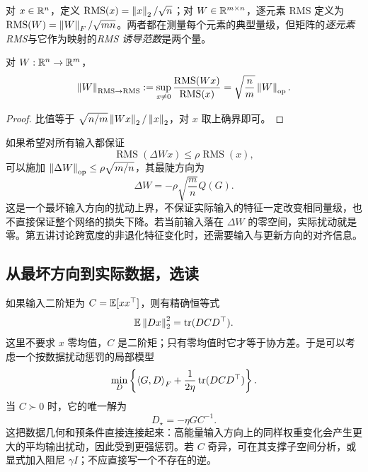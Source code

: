 对 $x\in\mathbb R^n$，定义
$\operatorname{RMS}(x)=\left\lVert x\right\rVert_2/\sqrt n$；对 $W\in\mathbb R^{m\times n}$，逐元素 RMS 定义为
$\operatorname{RMS}(W)=\left\lVert W\right\rVert_F/\sqrt{mn}$。两者都在测量每个元素的典型量级，但矩阵的\emph{逐元素 RMS}与它作为映射的\emph{RMS 诱导范数}是两个量。

\begin{proposition}
对 $W:\mathbb R^n\to\mathbb R^m$，
\begin{equation}
 \left\lVert W\right\rVert_{\mathrm{RMS}\to\mathrm{RMS}}
 :=\sup_{x\ne0}\frac{\operatorname{RMS}(Wx)}{\operatorname{RMS}(x)}
 =\sqrt{\frac nm}\left\lVert W\right\rVert_{\rm op}.
 \label{l4:rms-operator}
\end{equation}
\end{proposition}
\begin{proof}
比值等于 $\sqrt{n/m}\left\lVert Wx\right\rVert_2/\left\lVert x\right\rVert_2$，对 $x$ 取上确界即可。
\end{proof}

如果希望对所有输入都保证
\[
 \operatorname{RMS}(\Delta W x)\leq
 \rho\operatorname{RMS}(x),
\]
可以施加 $\left\lVert\Delta W\right\rVert_{\rm op}\leq\rho\sqrt{m/n}$，其最陡方向为
\begin{equation}
 \Delta W=-\rho\sqrt{\frac mn}Q(G).
 \label{l4:rms-steepest}
\end{equation}
这是一个最坏输入方向的扰动上界，不保证实际输入的特征一定改变相同量级，也不直接保证整个网络的损失下降。若当前输入落在 $\Delta W$ 的零空间，实际扰动就是零。第五讲讨论跨宽度的非退化特征变化时，还需要输入与更新方向的对齐信息。

\subsection{从最坏方向到实际数据，选读}

如果输入二阶矩为 $C=\mathbb E[xx^\top]$，则有精确恒等式
\begin{equation}
 \mathbb E\left\lVert Dx\right\rVert_2^2=\operatorname{tr}(DCD^\top).
 \label{l4:data-perturbation}
\end{equation}
这里不要求 $x$ 零均值，$C$ 是二阶矩；只有零均值时它才等于协方差。于是可以考虑一个按数据扰动惩罚的局部模型
\[
 \min_D\left\{\left\langle G,D\right\rangle_F+
 \frac{1}{2\eta}\operatorname{tr}(DCD^\top)\right\}.
\]
当 $C\succ0$ 时，它的唯一解为
\begin{equation}
 D_\star=-\eta GC^{-1}.
 \label{l4:data-preconditioning}
\end{equation}
这把数据几何和预条件直接连接起来：高能量输入方向上的同样权重变化会产生更大的平均输出扰动，因此受到更强惩罚。若 $C$ 奇异，可在其支撑子空间分析，或显式加入阻尼 $\gamma I$；不应直接写一个不存在的逆。

